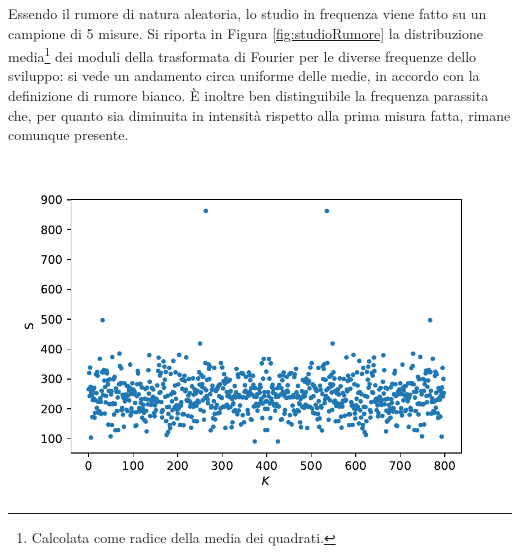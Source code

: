 \documentclass[10pt,oneside,a4paper]{article}
\newenvironment{Figure}
  {\par\medskip\noindent\minipage{\linewidth}}
  {\endminipage\par\medskip}
\begin{document}
\begin{multicols}{2}
Essendo il rumore di natura aleatoria, lo studio in frequenza viene fatto su un campione di 5 misure. Si riporta in Figura \ref{fig:studioRumore} la distribuzione media\footnote{Calcolata come radice della media dei quadrati.} dei moduli della trasformata di Fourier per le diverse frequenze dello sviluppo: si vede un andamento circa uniforme delle medie, in accordo con la definizione di rumore bianco. È inoltre ben distinguibile la frequenza parassita che, per quanto sia diminuita in intensità rispetto alla prima misura fatta, rimane comunque presente.
\begin{Figure}
	\begin{center}
	\includegraphics[width=\linewidth]{studioRumore}
	\label{fig:studioRumore}
	\end{center}
\end{Figure}


\end{multicols}
\end{document}
